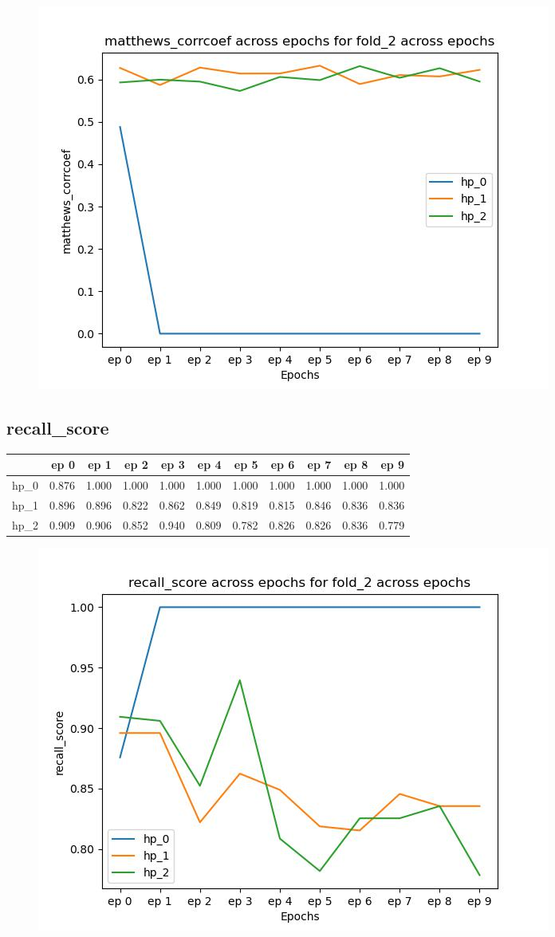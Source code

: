\documentclass{article}
\begin{document}
\begin{figure}[H]
\includegraphics[scale = 0.75]{fold_2/matthews_corrcoef}
\end{figure}
\subsection{recall\_score}
\begin{tabular}{lrrrrrrrrrr}
\toprule
{} &   ep 0 &   ep 1 &   ep 2 &   ep 3 &   ep 4 &   ep 5 &   ep 6 &   ep 7 &   ep 8 &   ep 9 \\
\midrule
hp\_0 &  0.876 &  1.000 &  1.000 &  1.000 &  1.000 &  1.000 &  1.000 &  1.000 &  1.000 &  1.000 \\
hp\_1 &  0.896 &  0.896 &  0.822 &  0.862 &  0.849 &  0.819 &  0.815 &  0.846 &  0.836 &  0.836 \\
hp\_2 &  0.909 &  0.906 &  0.852 &  0.940 &  0.809 &  0.782 &  0.826 &  0.826 &  0.836 &  0.779 \\
\bottomrule
\end{tabular}

\begin{figure}[H]
\includegraphics[scale = 0.75]{fold_2/recall_score}
\end{figure}
\end{document}

